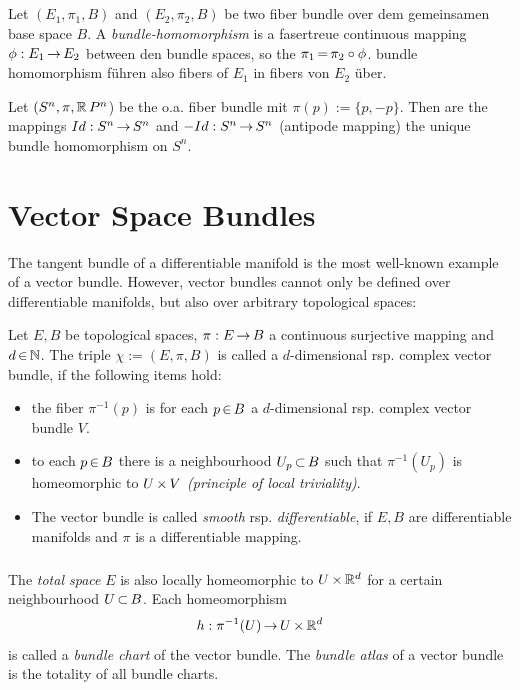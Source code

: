 \documentclass[11pt,twoside]{article}
\begin{document}
\subparagraph{}
Let $(E_1,\pi_1,B)$ and $(E_2,\pi_2,B)$ be two fiber bundle over dem
gemeinsamen base space $B$.
A \textit{bundle-homomorphism} is a fasertreue continuous mapping
$\phi:E_1 {\,\to\,} E_2$ between den bundle spaces,
so the $\pi_1 {\,=\,} \pi_2 \circ \phi$.
bundle homomorphism f\"uhren also fibers of $E_1$ in fibers
von $E_2$ \"uber.

\begin{example}
Let $(S^n, \pi, {\mathbb{R}}\,P^n$) be the o.a. fiber bundle mit
$\pi(p) := \{p,-p\}$.
Then are the mappings $Id:S^n {\,\to\,} S^n$ and $-Id:S^n {\,\to\,} S^n$
(antipode mapping) the unique bundle homomorphism on $S^n$.
\end{example}

\section{Vector Space Bundles}
The tangent bundle of a differentiable manifold is
the most well-known example of a vector bundle.
However,
vector bundles cannot only be defined over differentiable manifolds,
but also over arbitrary topological spaces:

\begin{definition}
Let $E,B$ be topological spaces,
$\pi:E {\,\to\,} B$ a continuous surjective mapping and $d {\,\in\,} {\mathbb{N}}$.
The triple $\chi := (E,\pi,B)$ is called a $d$-dimensional
rsp. complex vector bundle,
if the following items hold:

\begin{itemize}[leftmargin=15pt]
\item[1.]
the fiber $\pi^{-1}(p)$ is for each $p {\,\in\,} B$ a $d$-dimensional
rsp. complex vector bundle $V$.
\item[2.]
to each $p {\,\in\,} B$ there is a neighbourhood $U_p {\,\subset\,} B$
such that $\pi^{-1}(U_p)$ is homeomorphic to $U {\,\times\,} V$
\textit{(principle of local triviality)}.
\item[3.]
The vector bundle is called \textit{smooth} rsp. \textit{differentiable},
if $E,B$ are differentiable manifolds and $\pi$ is a differentiable mapping.
\end{itemize}
\end{definition}

\subparagraph{}
The \textit{total space} $E$ is also locally homeomorphic to $U {\,\times\,} {\mathbb{R}}^d$
for a certain neighbourhood $U {\,\subset\,} B$.
Each homeomorphism 
\[
h:\pi^{-1}(U) {\,\to\,} U {\,\times\,} {\mathbb{R}}^d
\]
is called a \textit{bundle chart} of the vector bundle.
The \textit{bundle atlas} of a vector bundle is the totality of all bundle charts.
\end{document}
